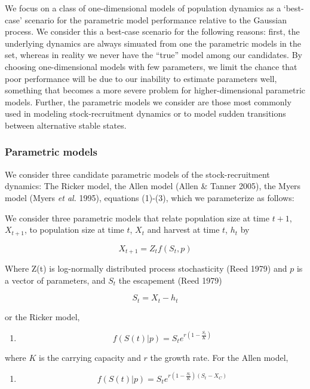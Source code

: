 \documentclass[author-year, 12pt,review]{elsarticle} %
\begin{document}
We focus on a class of one-dimensional models of population dynamics as
a `best-case' scenario for the parametric model performance relative to
the Gaussian process. We consider this a best-case scenario for the
following reasons: first, the underlying dynamics are always simuated
from one the parametric models in the set, whereas in reality we never
have the ``true'' model among our candidates. By choosing
one-dimensional models with few parameters, we limit the chance that
poor performance will be due to our inability to estimate parameters
well, something that becomes a more severe problem for
higher-dimensional parametric models. Further, the parametric models we
consider are those most commonly used in modeling stock-recruitment
dynamics or to model sudden transitions between alternative stable
states.

\subsubsection{Parametric models}\label{parametric-models}

We consider three candidate parametric models of the stock-recruitment
dynamics: The Ricker model, the Allen model (Allen \& Tanner 2005), the
Myers model (Myers \emph{et al.} 1995), equations (1)-(3), which we
parameterize as follows:

We consider three parametric models that relate population size at time
$t+1$, $X_{t+1}$, to population size at time $t$, $X_t$ and harvest at
time $t$, $h_t$ by

\[ X_{t+1}= Z_t f(S_t,p) \]

Where Z(t) is log-normally distributed process stochasticity (Reed 1979)
and $p$ is a vector of parameters, and $S_t$ the escapement (Reed 1979)

\[S_t = X_t - h_t\]

or the Ricker model,

\begin{enumerate}
\def\labelenumi{(\arabic{enumi})}
\itemsep1pt\parskip0pt
\item
  \[ f(S(t)|p) = S_t e^{r \left(1 - \frac{S_t}{K} \right) } \]
\end{enumerate}

where $K$ is the carrying capacity and $r$ the growth rate. For the
Allen model,

\begin{enumerate}
\def\labelenumi{(\arabic{enumi})}
\setcounter{enumi}{1}
\itemsep1pt\parskip0pt
\item
  \[ f(S(t)|p) = S_t e^{r \left(1 - \frac{S_t}{K}\right)\left(S_t - X_C\right)} \]
\end{enumerate}
\end{document}
